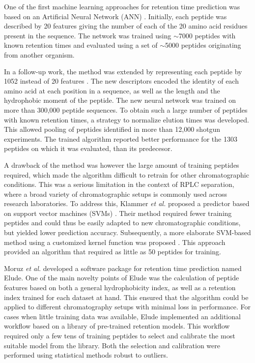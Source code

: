\documentclass[a4paper]{article}
\begin{document}
One of the first machine learning approaches for retention time
prediction was based on an Artificial Neural Network
(ANN) \cite{petritis2003}. Initially, each peptide was described by 20
features giving the number of each of the 20 amino acid residues
present in the sequence. The network was trained using $\sim$7000
peptides with known retention times and evaluated using a set of
$\sim$5000 peptides originating from another organism. 

In a follow-up work, the method was extended by representing each
peptide by 1052 instead of 20 features
\cite{petritis2006improved}. The new descriptors encoded the identity
of each amino acid at each position in a sequence, as well as the
length and the hydrophobic moment of the peptide. The new neural
network was trained on more than 300,000 peptide sequences. To obtain
such a large number of peptides with known retention times, a strategy
to normalize elution times was developed. This allowed pooling of
peptides identified in more than 12,000 shotgun experiments. The
trained algorithm reported better performance for the 1303 peptides
on which it was evaluated, than its predecesor.


A drawback of the method was however the large amount of training
peptides required, which made the algorithm difficult to retrain for
other chromatographic conditions. This was a serious limitation in the
context of RPLC separation, where a broad variety of chromatographic
setups is commonly used across research laboratories. To address this,
Klammer {\em et al.} proposed a predictor based on support vector
machines (SVMs) \cite{klammer2007improving}. Their method required
fewer training peptides and could thus be easily adapted to new
chromatographic conditions, but yielded lower prediction accuracy.
Subsequently, a more elaborate SVM-based method using a customized
kernel function was proposed \cite{rtpredict, rtpredictImproved}. This
approach provided an algorithm that required as little as 50 peptides
for training.




Moruz {\em et al.} \cite{elude1} developed a software package for
retention time prediction named {\sc Elude}. One of the main novelty
points of {\sc Elude} was the calculation of peptide features based on
both a general hydrophobicity index, as well as a retention index
trained for each dataset at hand. This ensured that the algorithm
could be applied to different chromatography setups with minimal loss
in performance. For cases when little training data was available,
{\sc Elude} implemented an additional workflow based on a library of
pre-trained retention models. This workflow required only a few tens
of training peptides to select and calibrate the most suitable model
from the library. Both the selection and calibration were performed
using statistical methods robust to outliers.
\end{document}
